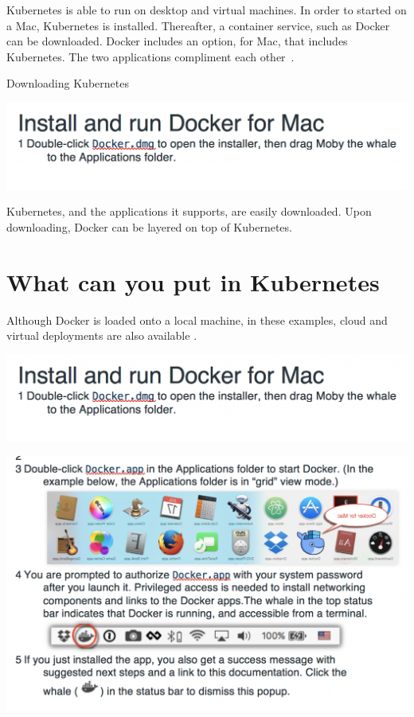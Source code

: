 Kubernetes is able to run on desktop and virtual machines.  In order
to started on a Mac, Kubernetes is installed.  Thereafter, a container
service, such as Docker can be downloaded.  Docker includes an option,
for Mac, that includes Kubernetes.  The two applications compliment
each other~\cite{hid-sp18-525-service}.  

Downloading Kubernetes


\includegraphics[width=1\columnwidth]{images/install-docker.png}

Kubernetes, and the applications it supports, are easily downloaded.
Upon downloading, Docker can be layered on top of Kubernetes.   

\section{What can you put in Kubernetes}

Although Docker is loaded onto a local machine, in these examples,
cloud and virtual deployments are also available
\cite{hid-sp18-525-docker}. 


\includegraphics[width=\columnwidth]{images/install-docker.png}

\includegraphics[width=\columnwidth]{images/install-docker2.png}

